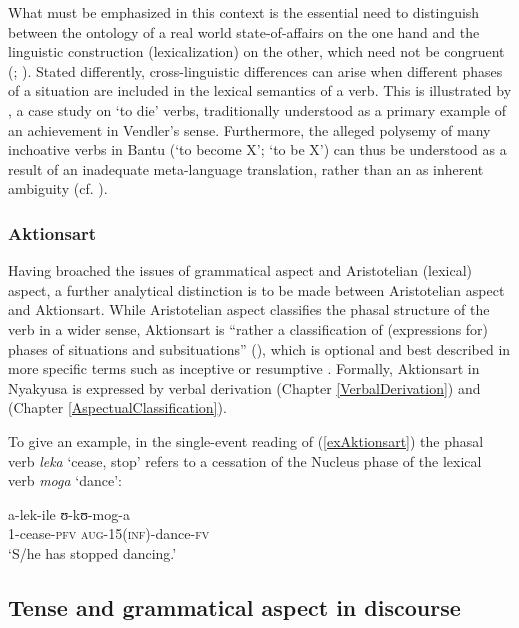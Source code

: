 What must be emphasized in this context is the essential need to distinguish between the ontology of a real world state-of-affairs on the one hand and the linguistic construction (lexicalization) on the other, which need not be congruent (\citealt[77–100]{BotneR1981}; \citealt{BickelB1997}). Stated differently, cross-linguistic differences can arise when different phases of a situation are included in the lexical semantics of a verb. This is illustrated by \citet{BotneR2003b}, a case study on \lq to die' verbs, traditionally understood as a primary example of an achievement in Vendler's sense. Furthermore, the alleged polysemy of many inchoative verbs in Bantu (\lq to become X'; \lq to be X') can thus be understood as a result of an inadequate meta-language translation, rather than an as inherent ambiguity (cf. \citealt[269, FN 249]{SeidelF2008}).
\subsubsection{Aktionsart}\label{Aktionsart}
Having broached the issues of grammatical aspect and Aristotelian (lexical) aspect, a further analytical distinction is to be made between Aristotelian aspect and Aktionsart. While Aristotelian aspect classifies the phasal structure of the verb in a wider sense, Aktionsart is ``rather a classification of (expressions for) phases of situations and subsituations'' (\citealt[170]{BinnickR1991}), which is optional and best described in more specific terms such as inceptive or resumptive \citep[ibid]{BinnickR1991}. Formally, Aktionsart in Nyakyusa is expressed by verbal derivation (Chapter \ref{VerbalDerivation}) and  (Chapter \ref{AspectualClassification}).

To give an example, in the single-event reading of (\ref{exAktionsart}) the phasal verb \textit{leka} \lq cease, stop' refers to a cessation of the Nucleus phase of the lexical verb \textit{moga} \lq dance':

\begin{exe}
	\ex\label{exAktionsart}
	 \gll a-lek-ile ʊ-kʊ-mog-a\\
	1-cease-\textsc{pfv} \textsc{aug}-15(\textsc{inf})-dance-\textsc{fv}\\
	\glt \lq S/he has stopped dancing.'
\end{exe}
\subsection{Tense and grammatical aspect in discourse}\label{TenseAspectDiscourse}
